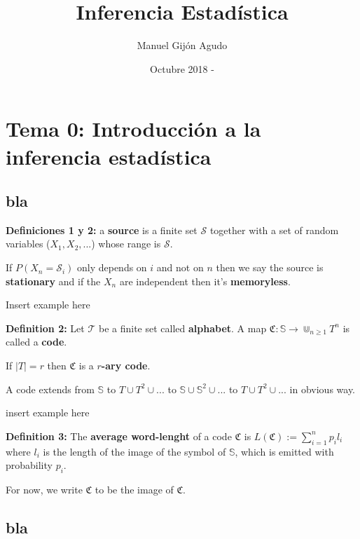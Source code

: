 \documentclass{article}
\title{Inferencia Estadística}
\author{Manuel Gijón Agudo }
\date{Octubre 2018 - }
\begin{document}
	\begin{titlepage}
		\maketitle{} 
	\end{titlepage}
	
	\newpage
	\tableofcontents
	\newpage
					
					
\section{Tema 0: Introducción a la inferencia estadística}

		\subsection{bla }
		
\noindent\textbf{Definiciones 1 y 2:}  a \textbf{source} is a finite set $\mathcal{S}$ together with a set of random variables ($X_1, X_2, ...$) whose range is $\mathcal{S}$.

If $P(X_n = \mathcal{S}_i)$ only depends on $i$ and not on $n$ then we say the source is \textbf{stationary} and if the $X_n$ are independent then it's \textbf{memoryless}.

Insert example here

\noindent\textbf{Definition 	2:} Let $\mathcal{T}$ be a finite set called \textbf{alphabet}. A map $\mathfrak{C}: \mathbb{S} \longrightarrow \Cup_{n \geq 1} T^{n}$ is called a \textbf{code}.

If $|T| = r$ then $\mathfrak{C}$ is a \textbf{$r$-ary code}. 

\noindent A code extends from $\mathbb{S}$ to $T \cup T^2 \cup ...$ to $\mathbb{S} \cup \mathbb{S}^2 \cup ...$  to $T \cup T^2 \cup ...$ in obvious way.

insert example here


\noindent\textbf{Definition 	3:} The \textbf{average word-lenght} of a code $\mathfrak{C}$ is $L(\mathfrak{C}) := \sum_{i = 1}^{n} p_i l_i$ where $l_i$ is the length of the image of the symbol of $\mathbb{S}$, which is emitted with probability $p_i$.

\noindent For now, we write $\mathfrak{C}$ to be the image of $\mathfrak{C}$. 

		\subsection{ bla}
	
\end{document}

